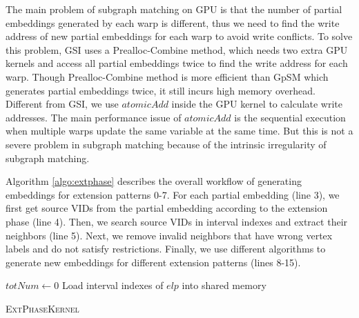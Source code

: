 The main problem of subgraph matching on GPU is that the number of partial embeddings generated by each warp is different, thus we need to find the write address of new partial embeddings for each warp to avoid write conflicts. To solve this problem, GSI \cite{zeng2020gsi} uses a Prealloc-Combine method, which needs two extra GPU kernels and access all partial embeddings twice to find the write address for each warp. Though Prealloc-Combine method is more efficient than GpSM \cite{tran2015fast} which generates partial embeddings twice, it still incurs high memory overhead. Different from GSI, we use $atomicAdd$ inside the GPU kernel to calculate write addresses. The main performance issue of $atomicAdd$ is the sequential execution when multiple warps update the same variable at the same time. But this is not a severe problem in subgraph matching because of the intrinsic irregularity of subgraph matching.


Algorithm \ref{algo:extphase} describes the overall workflow of generating embeddings for extension patterns 0-7. For each partial embedding (line 3), we first get source VIDs from the partial embedding according to the extension phase (line 4). Then, we search source VIDs in interval indexes and extract their neighbors (line 5).  Next, we remove invalid neighbors that have wrong vertex labels and do not satisfy restrictions. Finally, we use different algorithms to generate new embeddings for different extension patterns (lines 8-15).

\begin{algorithm}
$totNum \leftarrow 0$\;
Load interval indexes of $elp$ into shared memory\;

\caption{\textsc{ExtPhaseKernel}}
\label{algo:extphase}
\end{algorithm}

